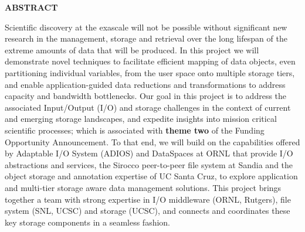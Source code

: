 \vspace{-\belowdisplayskip}
\vspace{-\abovedisplayskip}
\medskip

\begin{center}
\textbf{ABSTRACT}
\end{center}

\vspace{-\belowdisplayskip}

\enlargethispage{2\baselineskip}
Scientific discovery at the exascale will not be possible without significant
new research in the management, storage and retrieval over the long lifespan
of the extreme amounts of data that will be produced.
In this project we will
demonstrate novel techniques to  facilitate efficient mapping of data
objects, even partitioning individual variables, from
the user space onto multiple storage tiers, and enable application-guided
data reductions and transformations to address capacity and bandwidth
bottlenecks. 
Our goal in this project is
to address the associated Input/Output (I/O) and storage challenges in the context of
current and emerging storage landscapes, and expedite insights into mission
critical scientific processes; which is associated with {\bf theme two} of the Funding Opportunity Announcement. To that end, we will build on the
capabilities offered by Adaptable I/O System (ADIOS) and DataSpaces at ORNL that provide I/O abstractions
and services, the Sirocco peer-to-peer file system at
Sandia and the object storage and annotation expertise of UC Santa Cruz, to
explore application and multi-tier storage aware data management
solutions.    This project
brings together a  team with strong expertise in I/O middleware (ORNL, Rutgers), file system (SNL, UCSC) and storage (UCSC), and connects and
coordinates these key storage components in a seamless fashion.

